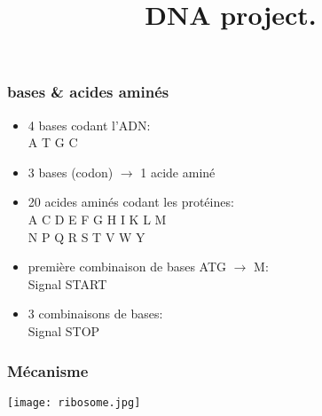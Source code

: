 \documentclass{beamer}
\title{DNA project.}
\institute{Artilect}
\begin{document}
\begin{frame}
\titlepage
\end{frame}

\begin{frame}
\frametitle{bases \& acides aminés}
\begin{itemize}
	\item<1-> 4 bases codant l'ADN:\\
	\hspace{120pt} A T G C
	\item<2-> 3 bases (codon) $\to$ 1 acide aminé
	\item<3-> 20 acides aminés codant les protéines:\\
	\hspace{120pt} A C D E F G H I K L M\\
	\hspace{120pt} N P Q R S T V W Y
	\item<4-> première combinaison de bases ATG $\to$ M:\\
	\hspace{120pt} Signal START
	\item<5-> 3 combinaisons de bases:\\
	\hspace{120pt} Signal STOP
	
\end{itemize}
\end{frame}

\begin{frame}
\frametitle{Mécanisme}
\centering
	\texttt{[image: ribosome.jpg]}
\end{frame}
\end{document}
